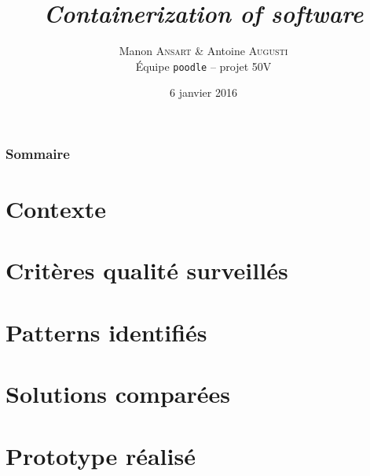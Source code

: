 \documentclass[handout]{beamer}
\title{
    \textit{Containerization of software}
}
\author{
    Manon \textsc{Ansart} \& Antoine \textsc{Augusti}\\Équipe \texttt{poodle} -- projet 50V
}
\date{6 janvier 2016}
\begin{document}
    \begin{frame}[plain]
        \titlepage
    \end{frame}

    \begin{frame}[plain]
        \frametitle{Sommaire}
        \tableofcontents
    \end{frame}

    \section{Contexte}
        

    \section{Critères qualité surveillés}
        

    \section{Patterns identifiés}
        

    \section{Solutions comparées}
        

    \section{Prototype réalisé}
        

\end{document}

